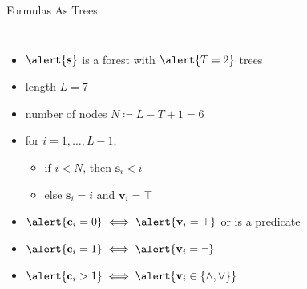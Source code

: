 \documentclass{beamer}
\begin{document}
\begin{frame}{Formulas As Trees}
\begin{columns}
\begin{column}{0.63\textwidth}
{\begin{tabular}{c c|C|C|C|C|C|D}
        \end{tabular}
      }
      \begin{itemize}
      \item<4-> $\alert{\mathbf{s}}$ is a forest with $\alert{T = 2}$ trees
      \item<7-> length \alert{$L = 7$}
      \item<7-> number of nodes \alert{$N \coloneqq L - T + 1 = 6$}
      \item<7-> for \alert{$i = 1, \dots, L - 1$},
        \begin{itemize}
        \item if \alert{$i < N$}, then \alert{$\mathbf{s}_i < i$}
        \item else \alert{$\mathbf{s}_i = i$} and \alert{$\mathbf{v}_i = \top$}
        \end{itemize}
      \item<8-> $\alert{\mathbf{c}_i = 0} \iff \alert{\mathbf{v}_i = \top}$ or is a predicate
      \item<8-> $\alert{\mathbf{c}_i = 1} \iff \alert{\mathbf{v}_i = \neg}$
      \item<8-> $\alert{\mathbf{c}_i > 1} \iff \alert{\mathbf{v}_i \in \{ \land, \lor \}}$
      \end{itemize}
    \end{column}
  \end{columns}
\end{frame}
\end{document}
